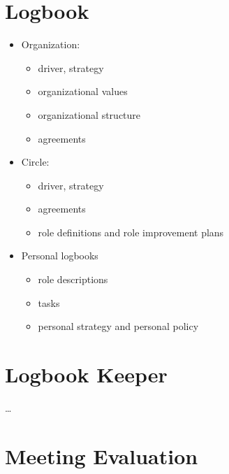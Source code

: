\section{Logbook}
\label{logbook}

\begin{itemize}
\item Organization:

\begin{itemize}
\item driver, strategy

\item organizational values

\item organizational structure

\item agreements

\end{itemize}

\item Circle:

\begin{itemize}
\item driver, strategy

\item agreements

\item role definitions and role improvement plans

\end{itemize}

\item Personal logbooks

\begin{itemize}
\item role descriptions

\item tasks

\item personal strategy and personal policy

\end{itemize}

\end{itemize}

\section{Logbook Keeper}
\label{logbookkeeper}

{\ldots}

\section{Meeting Evaluation}
\label{meetingevaluation}

